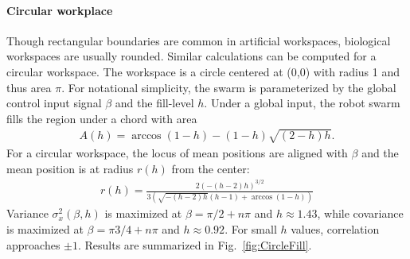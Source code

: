 \paragraph{Circular workplace}
Though rectangular boundaries are common in artificial workspaces, biological workspaces are usually rounded.
Similar calculations can be computed for a circular workspace.  The workspace is a circle centered at (0,0) with radius 1 and thus area $\pi$.
For notational simplicity, the swarm is parameterized by the global control input signal $\beta$ and the fill-level $h$.  
Under a global input, the robot swarm fills the region under a chord with area
\begin{align}
A(h) = \arccos(1-h)-(1-h) \sqrt{(2-h) h}.
\end{align}
For a circular workspace, the locus of mean positions are aligned with $\beta$ and the mean position is at radius $r(h)$ from the center:
\begin{align}
r(h) = \frac{2 (-(h-2) h)^{3/2}}{3 \left(\sqrt{-(h-2) h} (h-1)+\arccos(1-h)\right)}
\end{align}
Variance $\sigma^2_x(\beta,h)$ is maximized at $\beta = \pi/2+n \pi$ and $h\approx1.43$, while covariance is maximized at $\beta = \pi3/4+n \pi$ and $h\approx0.92.$ For small $h$ values, correlation approaches $\pm1$. Results are summarized in Fig.~\ref{fig:CircleFill}.

%


